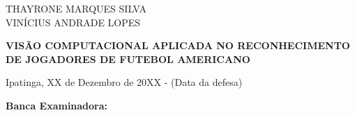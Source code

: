 \addtocounter{page}{+1}
\begin{center}

THAYRONE MARQUES SILVA\\
VINÍCIUS ANDRADE LOPES\\

\vspace{1cm}

\textbf{VISÃO COMPUTACIONAL APLICADA NO RECONHECIMENTO DE JOGADORES DE FUTEBOL AMERICANO}

\end{center}

\vspace{.4cm}

\begin{flushright}
\parbox{8cm}{
}
\end{flushright}

\begin{flushright}
\parbox{8cm}{
}
\end{flushright}

\vspace{.6cm}



\noindent Ipatinga, XX de Dezembro de 20XX - (Data da defesa)

\begin{center}
\bfseries Banca Examinadora:
\end{center}


%
%
%
%



